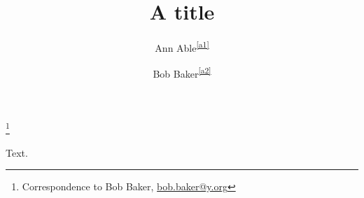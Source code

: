 \documentclass{amsart}
\begin{document}
\title{A title}
\author{Ann Able\textsuperscript{\ref{a1}}}
\address{\label{a1}University X, Town}
\author{Bob Baker\textsuperscript{\ref{a2}}}
\address{\label{a2}University Y, City}
\thanks{Correspondence to Bob Baker, \href{mailto:bob.baker@y.org}{bob.baker@y.org}}
\maketitle
Text.
\end{document}
